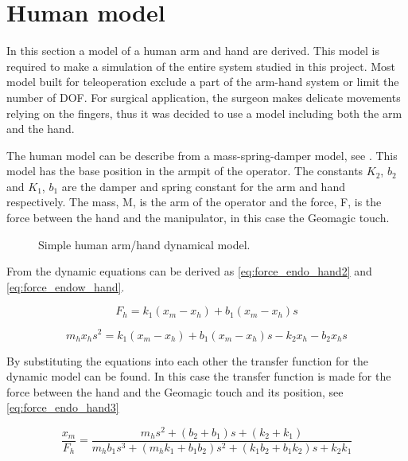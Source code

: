 \section{Human model}
In this section a model of a human arm and hand are derived. This model is required to make a simulation of the entire system studied in this project. Most model built for teleoperation exclude a part of the arm-hand system\cite{lawrence1992stability} or limit the number of \gls{DOF}\cite{tsuji1994spatial}. For surgical application, the surgeon makes delicate movements relying on the fingers, thus it was decided to use a model including both the arm and the hand.

The human model can be describe from a mass-spring-damper model\cite{speich2005modeling}, see . This model has the base position in the armpit of the operator. The constants $K_2$, $b_2$ and $K_1$, $b_1$ are the damper and spring constant for the arm and hand respectively. The mass, M, is the arm of the operator and the force, F, is the force between the hand and the manipulator, in this case the Geomagic touch.

\begin{figure}[H]
\centering

\caption{Simple human arm/hand dynamical model.}
\label{fig:human_model}
\end{figure}


From  the dynamic equations can be derived as \eqref{eq:force_endo_hand2} and \eqref{eq:force_endow_hand}.

\begin{equation}
F_h = k_1(x_m-x_h)+b_1(x_m-x_h)s
\label{eq:force_endo_hand2}
\end{equation}

\begin{equation}
m_hx_hs^2 = k_1(x_m-x_h)+b_1(x_m-x_h)s-k_2x_h-b_2x_hs
\label{eq:force_endow_hand}
\end{equation}

By substituting the equations into each other the transfer function for the dynamic model can be found. In this case the transfer function is made for the force between the hand and the Geomagic touch and its position, see \eqref{eq:force_endo_hand3}

\begin{equation}
\frac{x_m}{F_h} = \frac{m_hs^2+(b_2+b_1)s+(k_2+k_1)}{m_hb_1s^3+(m_hk_1+b_1b_2)s^2+(k_1b_2+b_1k_2)s+k_2k_1}
\label{eq:force_endo_hand3}
\end{equation}